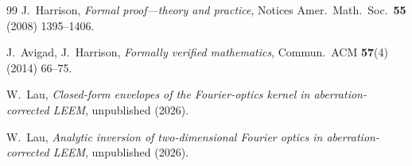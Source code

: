 \documentclass[11pt,a4paper]{article}
\theoremstyle{definition}
\theoremstyle{remark}
\begin{document}
\begin{thebibliography}{99}
J.~Harrison,
\emph{Formal proof---theory and practice},
Notices Amer.\ Math.\ Soc.\ \textbf{55} (2008) 1395--1406.

J.~Avigad, J.~Harrison,
\emph{Formally verified mathematics},
Commun.\ ACM \textbf{57}(4) (2014) 66--75.

W.~Lau,
\emph{Closed-form envelopes of the Fourier-optics kernel in
aberration-corrected LEEM},
unpublished (2026).

W.~Lau,
\emph{Analytic inversion of two-dimensional Fourier optics in
aberration-corrected LEEM},
unpublished (2026).

\end{thebibliography}
\end{document}
